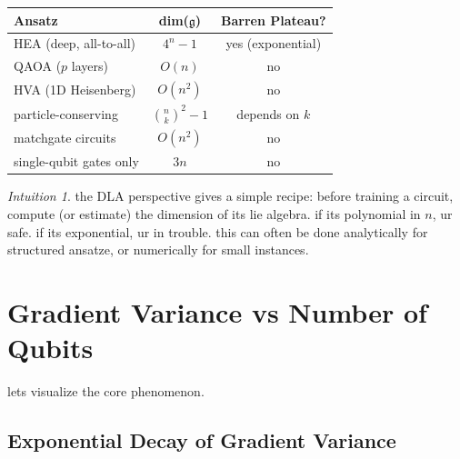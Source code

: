 \documentclass[11pt,a4paper]{article}
\theoremstyle{definition}
\theoremstyle{remark}
\newtheorem*{intuition}{Intuition}
\begin{document}
\begin{center}
\renewcommand{\arraystretch}{1.4}
\begin{tabular}{|l|c|c|}
\hline
\textbf{Ansatz} & \textbf{dim($\mathfrak{g}$)} & \textbf{Barren Plateau?} \\
\hline
HEA (deep, all-to-all) & $4^n - 1$ & yes (exponential) \\
\hline
QAOA ($p$ layers) & $O(n)$ & no \\
\hline
HVA (1D Heisenberg) & $O(n^2)$ & no \\
\hline
particle-conserving & $\binom{n}{k}^2 - 1$ & depends on $k$ \\
\hline
matchgate circuits & $O(n^2)$ & no \\
\hline
single-qubit gates only & $3n$ & no \\
\hline
\end{tabular}
\end{center}

\begin{intuition}
the DLA perspective gives a simple recipe: before training a circuit, compute (or estimate) the dimension of its lie algebra. if its polynomial in $n$, ur safe. if its exponential, ur in trouble. this can often be done analytically for structured ansatze, or numerically for small instances.
\end{intuition}

\section{Gradient Variance vs Number of Qubits}

lets visualize the core phenomenon.

\subsection{Exponential Decay of Gradient Variance}
\end{document}
